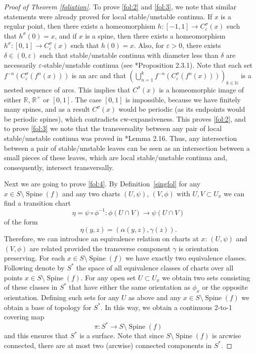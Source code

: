 \documentclass{amsart}
\theoremstyle{plain}
\theoremstyle{definition}
\newcommand{\spine}{\operatorname{Spine}}
\newcommand{\N}{\mathbb{N}}
\newcommand{\eps}{\varepsilon}
\begin{document}
\begin{proof}[Proof of Theorem \ref{foliation}]
To prove \eqref{fol:2} and \eqref{fol:3}, we note that similar statements were already proved for local stable/unstable continua. If $x$ is a regular point, then there exists a homeomorphism $h\colon[-1,1]\to C^{\sigma}_{\eps}(x)$ such that $h^{\sigma}(0)=x$, and if $x$ is a spine, then there exists a homeomorphism $h^{\sigma}\colon[0,1]\to C^{\sigma}_{\eps}(x)$ such that $h(0)=x$. Also, for $\eps>0$, there exists $\delta\in(0,\eps)$ such that stable/unstable continua with diameter less than $\delta$ are necessarily $\eps$-stable/unstable continua (see \cite{ArD}*{Proposition 2.3.1}). 
Note that each set $f^{-n}(C^\sigma_{\eps}(f^n(x)))$
is an arc and that $(\bigcup_{n=1}^k f^{-n}(C^\sigma_{\eps}(f^n(x))))_{k\in\N}$ is a nested sequence of arcs.
This implies that $C^\sigma(x)$ is a homeomorphic image of either $\mathbb{R}$,
$\mathbb{R}^+$ or $[0,1]$. The case $[0,1]$ is impossible, because we have finitely many spines, and as a result $C^\sigma(x)$ would be periodic (as its endpoints would be periodic spines), which contradicts cw-expansiveness. This proves \eqref{fol:2}, and to prove \eqref{fol:3} we note that the transversality between any pair of local stable/unstable continua was proved in \cite{ACS}*{Lemma 2.16}. Thus, any intersection between a pair of stable/unstable leaves can be seen as an intersection between a small pieces of these leaves, which are local stable/unstable continua and, consequently, intersect transversally. 

Next we are going to prove \eqref{fol:4}. %
By Definition~\ref{singfol} for any $x\in S\setminus \spine(f)$ and any two charts $(U,\psi)$, $(V,\phi)$ with $U,V\subset U_x$ we can find a transition chart $$\eta=\psi\circ \phi^{-1}\colon \phi(U\cap V)\to \psi (U\cap V)$$ of the form $$\eta(y,z)=(\alpha(y,z),\gamma(z)).$$
Therefore, we can introduce an equivalence relation on charts at $x$: $(U,\psi)$ and $(V,\phi)$ are related provided the transverse component $\gamma$ is orientation preserving. For each $x\in S\setminus \spine(f)$ we have exactly two equivalence classes. Following \cite[p.17]{HeHi} denote by $S^*$
the space of all equivalence classes of charts over all points $x\in S\setminus \spine(f)$.
For any open set $U\subset U_x$ we obtain two sets consisting of these classes in $S^*$
that have either the same orientation as $\phi_x$ or the opposite orientation. Defining such sets for any $U$ as above and any $x\in S\setminus \spine(f)$ we obtain a base of topology for $S^*$. In this way, we obtain a continuous 2-to-1 covering map $$\pi \colon S^*\to S\setminus \spine(f)$$ and this ensures that $S^*$ is a surface. Note that since $S\setminus \spine(f)$ is arcwise connected, there are at most two (arcwise) connected components in $S^*$. 


\end{proof}
\end{document}
